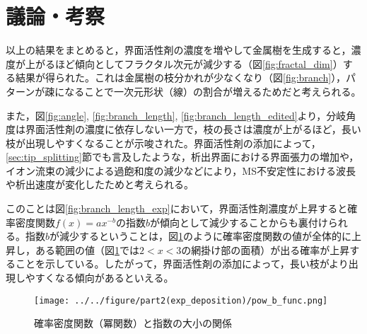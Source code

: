\documentclass[autodetect-engine,dvi=dvipdfmx,a4paper,ja=standard,oneside,openany,11pt,draft]{bxjsbook}
\begin{document}
\section{議論・考察}
以上の結果をまとめると，界面活性剤の濃度を増やして金属樹を生成すると，濃度が上がるほど傾向としてフラクタル次元が減少する（図\ref{fig:fractal_dim}）する結果が得られた。これは金属樹の枝分かれが少なくなり（図\ref{fig:branch}），パターンが疎になることで一次元形状（線）の割合が増えるためだと考えられる。

また，図\ref{fig:angle}, \ref{fig:branch_length}, \ref{fig:branch_length_edited}より，分岐角度は界面活性剤の濃度に依存しない一方で，枝の長さは濃度が上がるほど，長い枝が出現しやすくなることが示唆された。界面活性剤の添加によって，\ref{sec:tip_splitting}節でも言及したような，析出界面における界面張力の増加や，イオン流束の減少による過飽和度の減少などにより，MS不安定性における波長や析出速度が変化したためと考えられる。

このことは図\ref{fig:branch_length_exp}において，界面活性剤濃度が上昇すると確率密度関数$f(x)=ax^{-b}$の指数$b$が傾向として減少することからも裏付けられる。指数$b$が減少するということは，図\ref{fig:pow_b_func}のように確率密度関数の値が全体的に上昇し，ある範囲の値（図\ref{fig:pow_b_func}では$2<x<3$の網掛け部の面積）が出る確率が上昇することを示している。したがって，界面活性剤の添加によって，長い枝がより出現しやすくなる傾向があるといえる。

\begin{figure}[htbp]
  \centering
  \texttt{[image: ../../figure/part2(exp\_deposition)/pow\_b\_func.png]}
  \caption{確率密度関数（冪関数）と指数の大小の関係}
  \label{fig:pow_b_func}
\end{figure}

\ifdraft{
  
  
}{}
\end{document}

